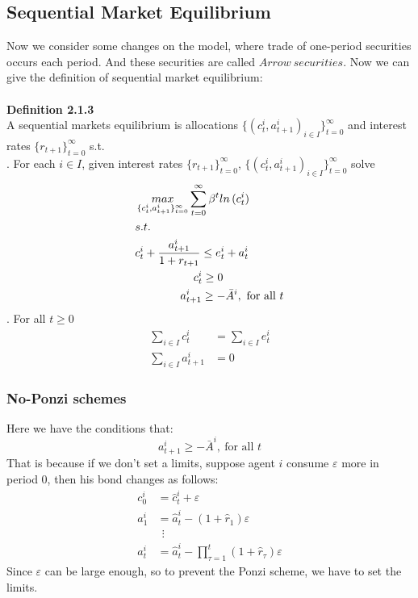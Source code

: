\documentclass{article}
\begin{document}
\subsection{Sequential Market Equilibrium}
Now we consider some changes on the model, where trade of one-period securities occurs each period. And these securities are called $Arrow\ securities$. Now we can give the definition of sequential market equilibrium:\\\\
\textbf{Definition 2.1.3}\\
A sequential markets equilibrium is allocations $\{(c^i_t, a^i_{t+1})_{i \in I}\}^\infty_{t=0}$ and interest rates $\{r_{t+1}\}^\infty_{t=0}$ s.t.\\ 
. For each $i \in I$, given interest rates $\{r_{t+1}\}^\infty_{t=0}$, $\{(c^i_t, a^i_{t+1})_{i \in I}\}^\infty_{t=0}$ solve
\begin{align*}
	&\mathop{max}\limits_{\{c^i_t, a^i_{t+1}\}^\infty_{t=0}} \sum\limits^\infty_{t=0} \beta^t ln\, (c^i_t)\\
	&s.t. \\
	& c^i_t + \frac{a^i_{t+1}}{1 + r_{t+1}} \leq e^i_t + a^i_t\\
	&\indent\indent\indent\ \ c^i_t \geq 0\\
	&\indent\indent\ \ \ a^i_{t+1} \geq -\bar{A}^i,\ \text{for all $t$}
\end{align*}
. For all $t \geq 0$
\begin{align*}
	\sum\limits_{i \in I} c^i_t &= \sum\limits_{i \in I} e^i_t\\
	\sum\limits_{i \in I} a^i_{t+1} &= 0
\end{align*}

\subsubsection{No-Ponzi schemes}
Here we have the conditions that:
\begin{equation*}
	a^i_{t+1} \geq -\bar{A}^i,\ \text{for all $t$}
\end{equation*}
That is because if we don't set a limits, suppose agent $i$ consume $\varepsilon$ more in period 0, then his bond changes as follows:
\begin{align*}
	c^i_0 &= \hat{c}^i_t + \varepsilon\\
	a^i_1 &= \hat{a}^i_t - (1 + \hat{r}_1)\varepsilon\\
	&\ \ \vdots\\
	a^i_t &= \hat{a}^i_t - \prod\limits^t_{\tau=1}(1 + \hat{r}_\tau)\varepsilon  
\end{align*}
Since $\varepsilon$ can be large enough, so to prevent the Ponzi scheme, we have to set the limits.
\end{document}
